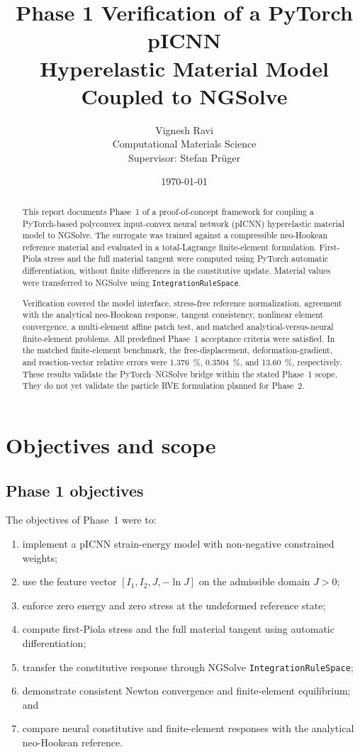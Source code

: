 \documentclass[11pt,a4paper]{article}
\title{%
  \textbf{Phase 1 Verification of a PyTorch pICNN\\
  Hyperelastic Material Model Coupled to NGSolve}
}
\author{%
  Vignesh Ravi\\
  Computational Materials Science\\[1mm]
  Supervisor: Stefan Prüger
}
\date{\today}
\begin{document}
\maketitle

\begin{abstract}
This report documents Phase~1 of a proof-of-concept framework for coupling a
PyTorch-based polyconvex input-convex neural network (pICNN) hyperelastic
material model to NGSolve. The surrogate was trained against a compressible
neo-Hookean reference material and evaluated in a total-Lagrange
finite-element formulation. First-Piola stress and the full material tangent
were computed using PyTorch automatic differentiation, without finite
differences in the constitutive update. Material values were transferred to
NGSolve using \texttt{IntegrationRuleSpace}.

Verification covered the model interface, stress-free reference
normalization, agreement with the analytical neo-Hookean response, tangent
consistency, nonlinear element convergence, a multi-element affine patch
test, and matched analytical-versus-neural finite-element problems. All
predefined Phase~1 acceptance criteria were satisfied. In the matched
finite-element benchmark, the free-displacement, deformation-gradient, and
reaction-vector relative errors were \SI{1.376}{\percent},
\SI{0.3504}{\percent}, and \SI{13.60}{\percent}, respectively. These results
validate the PyTorch--NGSolve bridge within the stated Phase~1 scope. They do
not yet validate the particle RVE formulation planned for Phase~2.
\end{abstract}

\tableofcontents
\clearpage

\section{Objectives and scope}

\subsection{Phase 1 objectives}

The objectives of Phase~1 were to:
\begin{enumerate}[label=\arabic*.]
  \item implement a pICNN strain-energy model with non-negative constrained
        weights;
  \item use the feature vector
        $\left[I_1,I_2,J,-\ln J\right]$ on the admissible domain $J>0$;
  \item enforce zero energy and zero stress at the undeformed reference state;
  \item compute first-Piola stress and the full material tangent using
        automatic differentiation;
  \item transfer the constitutive response through NGSolve
        \texttt{IntegrationRuleSpace};
  \item demonstrate consistent Newton convergence and finite-element
        equilibrium; and
  \item compare neural constitutive and finite-element responses with the
        analytical neo-Hookean reference.
\end{enumerate}
\end{document}
